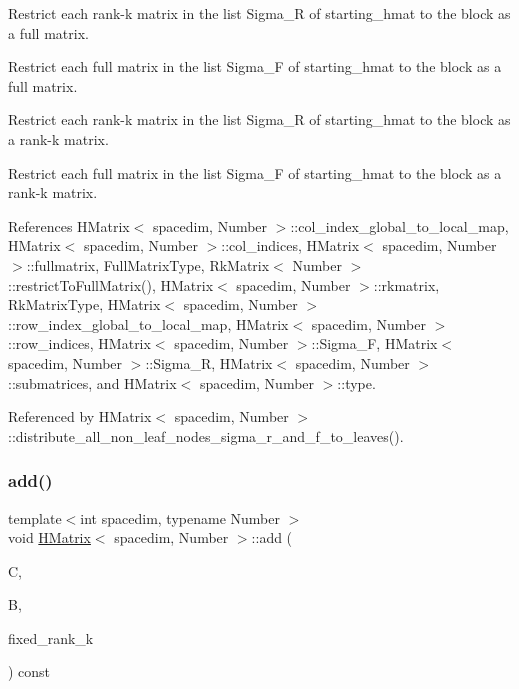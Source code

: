 Restrict each rank-\/k matrix in the list {\ttfamily Sigma\+\_\+R} of {\ttfamily starting\+\_\+hmat} to the block as a full matrix.

Restrict each full matrix in the list {\ttfamily Sigma\+\_\+F} of {\ttfamily starting\+\_\+hmat} to the block as a full matrix.

Restrict each rank-\/k matrix in the list {\ttfamily Sigma\+\_\+R} of {\ttfamily starting\+\_\+hmat} to the block as a rank-\/k matrix.

Restrict each full matrix in the list {\ttfamily Sigma\+\_\+F} of {\ttfamily starting\+\_\+hmat} to the block as a rank-\/k matrix.

References H\+Matrix$<$ spacedim, Number $>$\+::col\+\_\+index\+\_\+global\+\_\+to\+\_\+local\+\_\+map, H\+Matrix$<$ spacedim, Number $>$\+::col\+\_\+indices, H\+Matrix$<$ spacedim, Number $>$\+::fullmatrix, Full\+Matrix\+Type, Rk\+Matrix$<$ Number $>$\+::restrict\+To\+Full\+Matrix(), H\+Matrix$<$ spacedim, Number $>$\+::rkmatrix, Rk\+Matrix\+Type, H\+Matrix$<$ spacedim, Number $>$\+::row\+\_\+index\+\_\+global\+\_\+to\+\_\+local\+\_\+map, H\+Matrix$<$ spacedim, Number $>$\+::row\+\_\+indices, H\+Matrix$<$ spacedim, Number $>$\+::\+Sigma\+\_\+F, H\+Matrix$<$ spacedim, Number $>$\+::\+Sigma\+\_\+R, H\+Matrix$<$ spacedim, Number $>$\+::submatrices, and H\+Matrix$<$ spacedim, Number $>$\+::type.



Referenced by H\+Matrix$<$ spacedim, Number $>$\+::distribute\+\_\+all\+\_\+non\+\_\+leaf\+\_\+nodes\+\_\+sigma\+\_\+r\+\_\+and\+\_\+f\+\_\+to\+\_\+leaves().

\mbox{\label{classHMatrix_a8f96186426cd3147d5af32ca84ad25ea}} 
\subsubsection{\texorpdfstring{add()}{add()}\hspace{0.1cm}{\footnotesize\ttfamily [1/2]}}
{\footnotesize\ttfamily template$<$int spacedim, typename Number $>$ \\
void \hyperlink{classHMatrix}{H\+Matrix}$<$ spacedim, Number $>$\+::add (\begin{DoxyParamCaption}\item[{\hyperlink{classHMatrix}{H\+Matrix}$<$ spacedim, Number $>$ \&}]{C,  }\item[{const \hyperlink{classHMatrix}{H\+Matrix}$<$ spacedim, Number $>$ \&}]{B,  }\item[{const \hyperlink{classHMatrix_a5ca8dc549783d38371a01ecd621ecb34}{size\+\_\+type}}]{fixed\+\_\+rank\+\_\+k }\end{DoxyParamCaption}) const}

